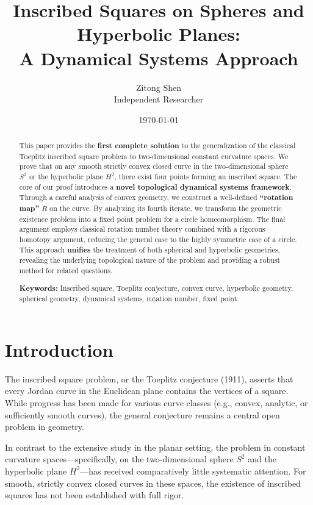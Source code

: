 \documentclass{article}
\title{Inscribed Squares on Spheres and Hyperbolic Planes: \\ A Dynamical Systems Approach}
\author{Zitong Shen \\
\footnotesize{Independent Researcher}
}
\date{\today}
\begin{document}
\maketitle

\begin{abstract}
    This paper provides the \textbf{first complete solution} to the generalization of the classical Toeplitz inscribed square problem to two-dimensional constant curvature spaces. We prove that on any smooth strictly convex closed curve in the two-dimensional sphere $S^2$ or the hyperbolic plane $H^2$, there exist four points forming an inscribed square. The core of our proof introduces a \textbf{novel topological dynamical systems framework}. Through a careful analysis of convex geometry, we construct a well-defined \textbf{“rotation map”} $R$ on the curve. By analyzing its fourth iterate, we transform the geometric existence problem into a fixed point problem for a circle homeomorphism. The final argument employs classical rotation number theory combined with a rigorous homotopy argument, reducing the general case to the highly symmetric case of a circle. This approach \textbf{unifies} the treatment of both spherical and hyperbolic geometries, revealing the underlying topological nature of the problem and providing a robust method for related questions.

    \noindent\textbf{Keywords:} Inscribed square, Toeplitz conjecture, convex curve, hyperbolic geometry, spherical geometry, dynamical systems, rotation number, fixed point.
\end{abstract}

\section{Introduction}

The inscribed square problem, or the Toeplitz conjecture (1911), asserts that every Jordan curve in the Euclidean plane contains the vertices of a square. While progress has been made for various curve classes (e.g., convex, analytic, or sufficiently smooth curves), the general conjecture remains a central open problem in geometry.

In contrast to the extensive study in the planar setting, the problem in constant curvature spaces---specifically, on the two-dimensional sphere $S^2$ and the hyperbolic plane $H^2$---has received comparatively little systematic attention. For smooth, strictly convex closed curves in these spaces, the existence of inscribed squares has not been established with full rigor.
\end{document}
